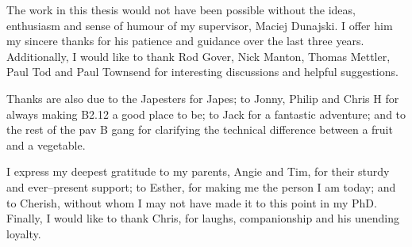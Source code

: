 
\begin{acknowledgements}      

The work in this thesis would not have been possible without the ideas, enthusiasm and sense of humour of my supervisor, Maciej Dunajski. I offer him my sincere thanks for his patience and guidance over the last three years. Additionally, I would like to thank Rod Gover, Nick Manton, Thomas Mettler, Paul Tod and Paul Townsend for interesting discussions and helpful suggestions.

Thanks are also due to the Japesters for Japes; to Jonny, Philip and Chris H for always making B2.12 a good place to be; to Jack for a fantastic adventure; and to the rest of the pav B gang for clarifying the technical difference between a fruit and a vegetable.

I express my deepest gratitude to my parents, Angie and Tim, for their sturdy and ever--present support; to Esther, for making me the person I am today; and to Cherish, without whom I may not have made it to this point in my PhD. Finally, I would like to thank Chris, for laughs, companionship and his unending loyalty.



\end{acknowledgements}
